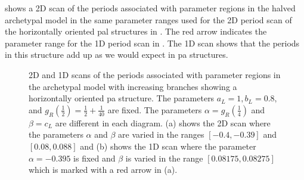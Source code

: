  shows a 2D scan of the periods associated with parameter regions in the halved archetypal model in the same parameter ranges used for the 2D period scan of the horizontally oriented \gls{pal} structures in .
The red arrow indicates the parameter range for the 1D period scan in .
The 1D scan shows that the periods in this structure add up as we would expect in \gls{pa} structures.

\begin{figure}
	\centering
	\caption[2D and 1D scans of the periods associated with parameter regions in the halved archetypal model with increasing branches showing a horizontally oriented period-adding structure]{
		2D and 1D scans of the periods associated with parameter regions in the archetypal model with increasing branches showing a horizontally oriented \gls{pa} structure.
		The parameters $a_L = 1, b_L = 0.8,$ and $g_R\left(\frac{1}{2}\right) = \frac{1}{2} + \frac{1}{40}$ are fixed.
		The parameters $\alpha = g_R\left(\frac{1}{4}\right)$ and $\beta = c_L$ are different in each diagram.
		(a) shows the 2D scan where the parameters $\alpha$ and $\beta$ are varied in the ranges $[-0.4, -0.39]$ and $[0.08, 0.088]$
		and (b) shows the 1D scan where the parameter $\alpha = -0.395$ is fixed and $\beta$ is varied in the range $[0.08175, 0.08275]$ which is marked with a red arrow in (a).
	}
	\label{fig:add.add.halved.hor}
\end{figure}


